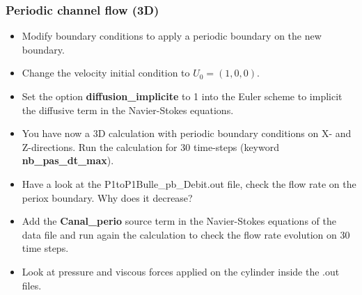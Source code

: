 \documentclass[10pt, hyperref={unicode=true,pdfusetitle, bookmarks=true,bookmarksnumbered=false,bookmarksopen=false, breaklinks=false,pdfborder={0 0 1},backref=true,colorlinks=true,linkcolor=darkblue,pageanchor}]{beamer}
\begin{document}
\begin{frame}
\frametitle{Periodic channel flow (3D)}
\begin{block}{}

\begin{itemize}
\item Modify boundary conditions to apply a periodic boundary on the new boundary. 

\item Change the velocity initial condition to $U_0=(1,0,0)$. 

\item Set the option \textbf{diffusion\_implicite} to 1 into the Euler scheme to implicit the diffusive term in the Navier-Stokes equations.

\item You have now a 3D calculation with periodic boundary conditions on X- and Z-directions. Run the calculation for 30 time-steps (keyword \textbf{nb\_pas\_dt\_max}).

\item Have a look at the P1toP1Bulle\_pb\_Debit.out file, check the flow rate on the periox boundary. Why does it decrease?

\item Add the \textbf{Canal\_perio} source term in the Navier-Stokes equations of the data file and run again the calculation to check the flow rate evolution on 30 time steps. 

\item Look at pressure and viscous forces applied on the cylinder inside the .out files.
\end{itemize}

\end{block}
\end{frame}
\end{document}
